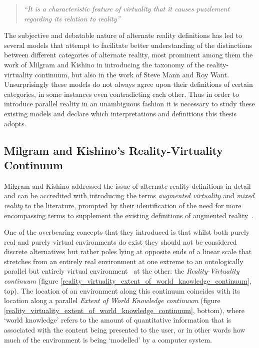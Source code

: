 \begin{quote}
	\textit{``It is a characteristic feature of virtuality that it causes puzzlement regarding its relation to reality''}~\cite{Brey2014}
\end{quote}

The subjective and debatable nature of alternate reality definitions has led to several models that attempt to facilitate better understanding of the distinctions between different categories of alternate reality, most prominent among them the work of Milgram and Kishino in introducing the taxonomy of the reality-virtuality continuum, but also in the work of Steve Mann and Roy Want. Unsurprisingly these models do not always agree upon their definitions of certain categories, in some instances even contradicting each other. Thus in order to introduce parallel reality in an unambiguous fashion it is necessary to study these existing models and declare which interpretations and definitions this thesis adopts.


\subsection{Milgram and Kishino's Reality-Virtuality Continuum}
\label{milgram&kishino}
Milgram and Kishino addressed the issue of alternate reality definitions in detail and can be accredited with introducing the terms \textit{augmented virtuality} and \textit{mixed reality} to the literature, prompted by their identification of the need for more encompassing terms to supplement the existing definitions of augmented reality~\cite{Milgram1999}.


One of the overbearing concepts that they introduced is that whilst both purely real and purely virtual environments do exist they should not be considered discrete alternatives but rather poles lying at opposite ends of a linear scale that stretches from an entirely real environment at one extreme to an ontologically parallel but entirely virtual environment~\cite{Qvortrup2002} at the other: the \textit{Reality-Virtuality continuum} (figure \ref{reality_virtuality_extent_of_world_knowledge_continuum}, top). The location of an environment along this continuum coincides with its location along a parallel \textit{Extent of World Knowledge continuum} (figure \ref{reality_virtuality_extent_of_world_knowledge_continuum}, bottom), where `world knowledge' refers to the amount of quantitative information that is associated with the content being presented to the user, or in other words how much of the environment is being `modelled' by a computer system.

